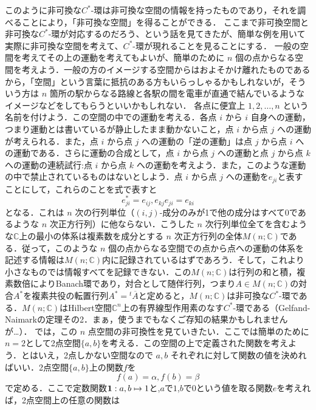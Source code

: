 このように非可換な$C^*$-環は非可換な空間の情報を持ったものであり，それを調べることにより，「非可換な空間」を得ることができる．
ここまで非可換空間と非可換な$C^*$-環が対応するのだろう、という話を見てきたが、簡単な例を用いて実際に非可換な空間を考えて、$C^*$-環が現れることを見ることにする．
一般の空間を考えてその上の運動を考えてもよいが、簡単のために $n$ 個の点からなる空間を考えよう．一般の方のイメージする空間からはおよそかけ離れたものであるから，「空間」という言葉に抵抗のある方もいらっしゃるかもしれないが，そういう方は $n$ 箇所の駅からなる路線と各駅の間を電車が直通で結んでいるようなイメージなどをしてもらうといいかもしれない．
各点に便宜上 $1,2,\dots,n$ という名前を付けよう．この空間の中での運動を考える．各点 $i$ から $i$ 自身への運動，つまり運動とは書いているが静止したまま動かないこと，点 $i$ から点 $j$ への運動が考えられる．また，点 $i$ から点 $j$ への運動の「逆の運動」は点 $j$ から点 $i$ への運動である．さらに運動の合成として，点 $i$ から点 $j$ への運動と点 $j$ から点 $k$ への運動の連続試行:点 $i$ から点 $k$ への運動を考えよう．また，このような運動の中で禁止されているものはないとしよう．点 $i$ から点 $j$ への運動を$e_{ji}$と表すことにして，これらのことを式で表すと
\[e_{ji}^*=e_{ij},　e_{kj}e_{ji}=e_{ki}\]
となる．これは $n$ 次の行列単位（$\left(i,j\right)$-成分のみが1で他の成分はすべて0であるような $n$ 次正方行列）に他ならない．こうした $n$ 次行列単位全てを含むような$\mathbb{C}$上の最小の体系は複素数を成分とする $n$ 次正方行列の全体$M\left(n;\mathbb{C}\right)$である．従って，このような $n$ 個の点からなる空間での点から点への運動の体系を記述する情報は$M\left(n;\mathbb{C}\right)$内に記録されているはずであろう．そして，これより小さなものでは情報すべてを記録できない．この$M\left(n;\mathbb{C}\right)$は行列の和と積，複素数倍によりBanach環であり，対合として随伴行列，つまり$A\in M\left(n;\mathbb{C}\right)$の対合$A^*$を複素共役の転置行列$A^*={}^{t}\overline{A}$と定めると，$M\left(n;\mathbb{C}\right)$は非可換な$C^*$-環である．$M\left(n;\mathbb{C}\right)$はHilbert空間$\mathbb{C}^n$上の有界線型作用素のなす$C^*$-環である（Gelfand-Naimarkの定理その2．まぁ，使うまでもなくご存知の結果かもしれませんが…）．
では，この $n$ 点空間の非可換性を見ていきたい．ここでは簡単のために$n=2$として2点空間$\{a,b\}$を考える．この空間の上で定義された関数を考えよう．とはいえ，2点しかない空間なので $a,b$ それぞれに対して関数の値を決めればいい．2点空間$\{a,b\}$上の関数$f$を
\[f(a)=\alpha,　f(b)=\beta\]
で定める．ここで定数関数${\bf 1}:a,b\mapsto 1$と,$a$で$1$,$b$で$0$という値を取る関数$e$を考えれば，2点空間上の任意の関数は
